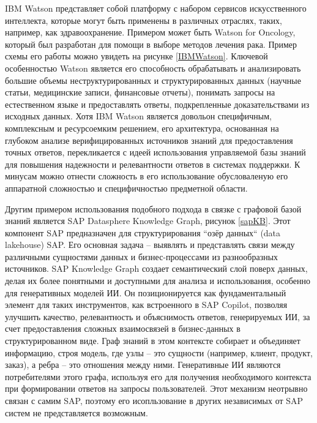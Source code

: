 IBM Watson\cite{watson} представляет собой платформу с набором сервисов искусственного интеллекта, которые могут быть применены в различных отраслях, таких, например, как здравоохранение. Примером может быть Watson for Oncology\cite{watsonO}, который был разработан для помощи в выборе методов лечения рака. Пример схемы его работы можно увидеть на рисунке \ref{IBMWatson}. Ключевой особенностью Watson является его способность обрабатывать и анализировать большие объемы неструктурированных и структурированных данных (научные статьи, медицинские записи, финансовые отчеты), понимать запросы на естественном языке и предоставлять ответы, подкрепленные доказательствами из исходных данных. Хотя IBM Watson является довольон специфичным, комплексным и ресурсоемким решением, его архитектура, основанная на глубоком анализе верифицированных источников знаний для предоставления точных ответов, перекликается с идеей использования управляемой базы знаний для повышения надежности и релевантности ответов в системах поддержки. К минусам можно отнести сложность в его использование обусловаленую его аппаратной сложностью и специфичностью предметной области.


Другим примером использования подобного подхода в связке с графовой базой знаний является SAP Datasphere Knowledge Graph\cite{sapkb}, рисунок \ref{sapKB}. Этот компонент SAP предназначен для структурирования ``озёр данных`` (data lakehouse) SAP. Его основная задача – выявлять и представлять связи между различными сущностями данных и бизнес-процессами из разнообразных источников. SAP Knowledge Graph создает семантический слой поверх данных, делая их более понятными и доступными для анализа и использования, особенно для генеративных моделей ИИ. Он позиционируется как фундаментальный элемент для таких инструментов, как встроенного в SAP Copilot, позволяя улучшить качество, релевантность и объяснимость ответов, генерируемых ИИ, за счет предоставления сложных взаимосвязей в бизнес-данных в структурированном виде. Граф знаний в этом контексте собирает и объединяет информацию, строя модель, где узлы – это сущности (например, клиент, продукт, заказ), а ребра – это отношения между ними. Генеративные ИИ являются потребителями этого графа, используя его для получения необходимого контекста при формировании ответов на запросы пользователей. Этот механизм неотрывно связан с самим SAP, поэтому его исопльзование в других независимых от SAP систем не представляется возможным.

